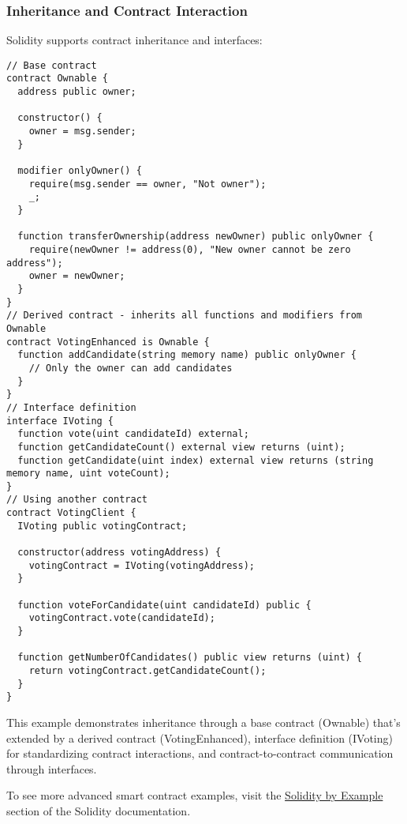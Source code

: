 \documentclass[12pt]{article}
\begin{document}
\noindent
\begin{minipage}[c]{\textwidth}
  \subsubsection*{Inheritance and Contract Interaction}
  Solidity supports contract inheritance and interfaces:

  \begin{lstlisting}[language=Solidity]
// Base contract
contract Ownable {
  address public owner;

  constructor() {
    owner = msg.sender;
  }

  modifier onlyOwner() {
    require(msg.sender == owner, "Not owner");
    _;
  }

  function transferOwnership(address newOwner) public onlyOwner {
    require(newOwner != address(0), "New owner cannot be zero address");
    owner = newOwner;
  }
}
// Derived contract - inherits all functions and modifiers from Ownable
contract VotingEnhanced is Ownable {
  function addCandidate(string memory name) public onlyOwner {
    // Only the owner can add candidates
  }
}
// Interface definition
interface IVoting {
  function vote(uint candidateId) external;
  function getCandidateCount() external view returns (uint);
  function getCandidate(uint index) external view returns (string memory name, uint voteCount);
}
// Using another contract
contract VotingClient {
  IVoting public votingContract;
  
  constructor(address votingAddress) {
    votingContract = IVoting(votingAddress);
  }

  function voteForCandidate(uint candidateId) public {
    votingContract.vote(candidateId);
  }

  function getNumberOfCandidates() public view returns (uint) {
    return votingContract.getCandidateCount();
  }
}
\end{lstlisting}
\end{minipage}

\noindent
This example demonstrates inheritance through a base contract (Ownable) that's extended by a derived contract (VotingEnhanced), interface definition (IVoting) for standardizing contract interactions, and contract-to-contract communication through interfaces.

\medskip
\noindent
To see more advanced smart contract examples, visit the \href{https://docs.soliditylang.org/en/latest/solidity-by-example.html}{Solidity by Example} section of the Solidity documentation.
\end{document}
